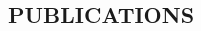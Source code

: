 \documentclass[11pt,a4paper,palatine]{moderncv}        %
\makeatletter
\newcommand*{\customcventry}[7][.25em]{
  \begin{tabular}{@{}l} 
    {\bfseries #4}
  \end{tabular}
  \hfill%
  \begin{tabular}{l@{}}
     {\bfseries #5}
  \end{tabular} \\
  \begin{tabular}{@{}l} 
    {\itshape #3}
  \end{tabular}
  \hfill%
  \begin{tabular}{l@{}}
     {\itshape #2}
  \end{tabular}
  \ifx&#7&%
  \else{\\%
    \begin{minipage}{\maincolumnwidth}%
      \small#7%
    \end{minipage}}\fi%
  \par\addvspace{#1}}
\makeatother
\begin{document}
\begin{CJK*}{UTF8}{gbsn}
\section{PUBLICATIONS}




\end{CJK*}
\end{document}
